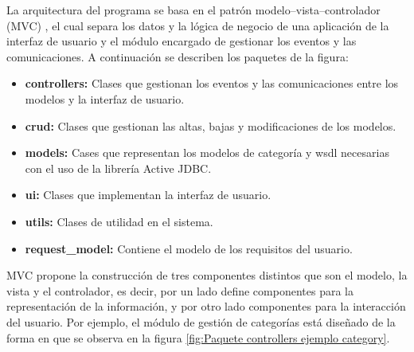 La arquitectura del programa se basa en el patrón modelo–vista–controlador (MVC) \cite{MVC}, el cual separa los datos y la lógica de negocio de una aplicación de la interfaz de usuario y el módulo encargado de gestionar los eventos y las comunicaciones. A continuación se describen los paquetes de la figura:

\begin{itemize}
	\item \textbf{controllers:} Clases que gestionan los eventos y las comunicaciones entre los modelos y la interfaz de usuario.
	\item \textbf{crud:} Clases que gestionan las altas, bajas y modificaciones de los modelos.
	\item \textbf{models:} Cases que representan los modelos de categoría y wsdl necesarias con el uso de la librería Active JDBC. 
	\item \textbf{ui:} Clases que implementan la interfaz de usuario.
	\item \textbf{utils:} Clases de utilidad en el sistema.
	\item \textbf{request\_model:} Contiene el modelo de los requisitos del usuario.
\end{itemize}

MVC propone la construcción de tres componentes distintos que son el modelo, la vista y el controlador, es decir, por un lado define componentes para la representación de la información, y por otro lado componentes para la interacción del usuario. Por ejemplo, el módulo de gestión de categorías está diseñado de la forma en que se observa en la figura \ref{fig:Paquete controllers ejemplo category}.\\


